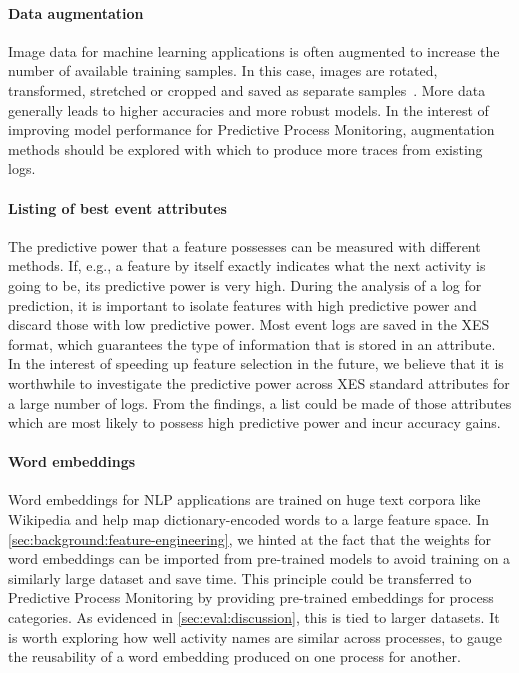 \paragraph{Data augmentation} Image data for machine learning applications is often augmented to increase the number of available training samples.
In this case, images are rotated, transformed, stretched or cropped and saved as separate samples~\cite{Thoma:2017,}.
More data generally leads to higher accuracies and more robust models.
In the interest of improving model performance for Predictive Process Monitoring, augmentation methods should be explored with which to produce more traces from existing logs.

\paragraph{Listing of best event attributes} The predictive power that a feature possesses can be measured with different methods.
If, e.g., a feature by itself exactly indicates what the next activity is going to be, its predictive power is very high.
During the analysis of a log for prediction, it is important to isolate features with high predictive power and discard those with low predictive power.
Most event logs are saved in the XES format, which guarantees the type of information that is stored in an attribute.
In the interest of speeding up feature selection in the future, we believe that it is worthwhile to investigate the predictive power across XES standard attributes for a large number of logs.
From the findings, a list could be made of those attributes which are most likely to possess high predictive power and incur accuracy gains.

\paragraph{Word embeddings} Word embeddings for NLP applications are trained on huge text corpora like Wikipedia and help map dictionary-encoded words to a large feature space.
In \autoref{sec:background:feature-engineering}, we hinted at the fact that the weights for word embeddings can be imported from pre-trained models to avoid training on a similarly large dataset and save time.
This principle could be transferred to Predictive Process Monitoring by providing pre-trained embeddings for process categories.
As evidenced in \autoref{sec:eval:discussion}, this is tied to larger datasets.
It is worth exploring how well activity names are similar across processes, to gauge the reusability of a word embedding produced on one process for another.

